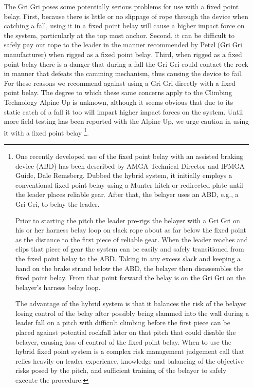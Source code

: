\documentclass[nonacm,acmtog]{acmart}
\begin{document}
The Gri Gri poses some potentially  serious problems for use with a fixed point
belay. First, because there is little or no slippage of rope through the device
when catching a fall, using it in a fixed point belay will cause a higher
impact force on the system, particularly at the top most anchor. Second, it can
be difficult to safely pay out rope to the leader in the manner recommended by
Petzl (Gri Gri manufacturer) when rigged as a fixed point belay. Third, when
rigged as a fixed point belay there is a danger that during a fall the Gri Gri
could contact the rock in manner that defeats the camming mechanism, thus
causing the device to fail. For these reasons we recommend against using a Gri
Gri directly with a fixed point belay. The degree to which these same concerns
apply to the Climbing Technology Alpine Up is unknown, although it seems
obvious that due to its static catch of a fall it too will impart higher impact
forces on the system. Until more field testing has been reported with the
Alpine Up, we urge caution in using it with a fixed point belay \footnote{One
recently developed use of the fixed point belay with an assisted braking device
(ABD) has been described by AMGA Technical Director and IFMGA Guide, Dale
Remsberg. Dubbed the hybrid system, it initially employs a conventional fixed
point belay using a Munter hitch or redirected plate until the leader places
reliable gear. After that, the belayer uses an ABD, e.g., a Gri Gri, to belay
the leader.

Prior to starting the pitch the leader pre-rigs the belayer with a Gri Gri on
his or her harness belay loop on slack rope about as far below the fixed point
as the distance to the first piece of reliable gear. When the leader reaches
and clips that piece of gear the system can be easily and safely transitioned
from the fixed point belay to the ABD. Taking in any excess slack and keeping a
hand on the brake strand below the ABD, the belayer then disassembles the fixed
point belay.  From that point forward the belay is on the Gri Gri on the
belayer’s harness belay loop.

The advantage of the hybrid system is that it balances the risk of the belayer
losing control of the belay after possibly being slammed into the wall during a
leader fall on a pitch with difficult climbing before the first piece can be
placed against potential rockfall later on that pitch that could disable the
belayer, causing loss of control of the fixed point belay. When to use the
hybrid fixed point system is a complex risk management judgement call that
relies heavily on leader experience, knowledge and balancing of the objective
risks posed by the pitch, and sufficient training of the belayer to safely
execute the procedure.}.
\end{document}
